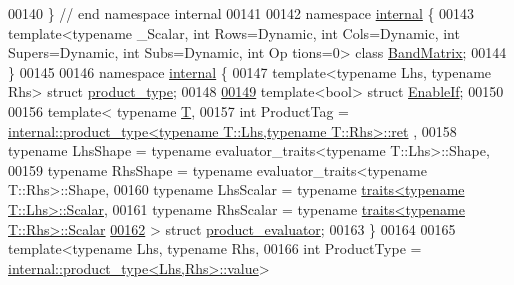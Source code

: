 \begin{DoxyCode}
00140 \} \textcolor{comment}{// end namespace internal}
00141 
00142 \textcolor{keyword}{namespace }\hyperlink{namespaceinternal}{internal} \{
00143 \textcolor{keyword}{template}<\textcolor{keyword}{typename} \_Scalar, \textcolor{keywordtype}{int} Rows=Dynamic, \textcolor{keywordtype}{int} Cols=Dynamic, \textcolor{keywordtype}{int} Supers=Dynamic, \textcolor{keywordtype}{int} Subs=Dynamic, \textcolor{keywordtype}{int} Op
      tions=0> \textcolor{keyword}{class }\hyperlink{group___core___module_class_eigen_1_1internal_1_1_band_matrix}{BandMatrix};
00144 \}
00145 
00146 \textcolor{keyword}{namespace }\hyperlink{namespaceinternal}{internal} \{
00147 \textcolor{keyword}{template}<\textcolor{keyword}{typename} Lhs, \textcolor{keyword}{typename} Rhs> \textcolor{keyword}{struct }\hyperlink{struct_eigen_1_1internal_1_1product__type}{product\_type};
00148 
\hyperlink{struct_eigen_1_1internal_1_1_enable_if}{00149} \textcolor{keyword}{template}<\textcolor{keywordtype}{bool}> \textcolor{keyword}{struct }\hyperlink{struct_eigen_1_1internal_1_1_enable_if}{EnableIf};
00150 
00156 \textcolor{keyword}{template}< \textcolor{keyword}{typename} \hyperlink{group___sparse_core___module}{T},
00157           \textcolor{keywordtype}{int} ProductTag = 
      \hyperlink{struct_eigen_1_1internal_1_1product__type}{internal::product\_type<typename T::Lhs,typename T::Rhs>::ret}
      ,
00158           \textcolor{keyword}{typename} LhsShape = \textcolor{keyword}{typename} evaluator\_traits<typename T::Lhs>::Shape,
00159           \textcolor{keyword}{typename} RhsShape = \textcolor{keyword}{typename} evaluator\_traits<typename T::Rhs>::Shape,
00160           \textcolor{keyword}{typename} LhsScalar = \textcolor{keyword}{typename} \hyperlink{struct_eigen_1_1internal_1_1traits}{traits<typename T::Lhs>::Scalar},
00161           \textcolor{keyword}{typename} RhsScalar = \textcolor{keyword}{typename} \hyperlink{struct_eigen_1_1internal_1_1traits}{traits<typename T::Rhs>::Scalar}
\hyperlink{struct_eigen_1_1internal_1_1product__evaluator}{00162}         > \textcolor{keyword}{struct }\hyperlink{struct_eigen_1_1internal_1_1product__evaluator}{product\_evaluator};
00163 \}
00164 
00165 \textcolor{keyword}{template}<\textcolor{keyword}{typename} Lhs, \textcolor{keyword}{typename} Rhs,
00166          \textcolor{keywordtype}{int} ProductType = \hyperlink{struct_eigen_1_1internal_1_1product__type}{internal::product\_type<Lhs,Rhs>::value}>

\end{DoxyCode}
